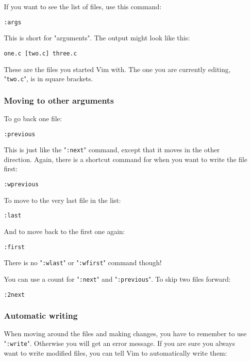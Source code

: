 If you want to see the list of files, use this command:

 \begin{Verbatim}[samepage=true]
 :args
 \end{Verbatim}

This is short for "arguments".
The output might look like this:

		\begin{Verbatim}[samepage=true]
    one.c [two.c] three.c 
						\end{Verbatim}

These are the files you started Vim with.
The one you are currently editing, "\verb!two.c!", is in square brackets.

\subsubsection{Moving to other arguments}
To go back one file:

 \begin{Verbatim}[samepage=true]
 :previous
 \end{Verbatim}

This is just like the "\verb!:next!" command, except that it moves in the other direction.
Again, there is a shortcut command for when you want to write the file first:

 \begin{Verbatim}[samepage=true]
 :wprevious
 \end{Verbatim}

To move to the very last file in the list:

 \begin{Verbatim}[samepage=true]
 :last
 \end{Verbatim}

And to move back to the first one again:

 \begin{Verbatim}[samepage=true]
 :first
 \end{Verbatim}

There is no "\verb!:wlast!" or "\verb!:wfirst!" command though!

You can use a count for "\verb!:next!" and "\verb!:previous!".
To skip two files forward:

 \begin{Verbatim}[samepage=true]
 :2next
 \end{Verbatim}

\subsubsection{Automatic writing}
When moving around the files and making changes, you have to remember to use "\verb!:write!".
Otherwise you will get an error message.
If you are sure you always want to write modified files, you can tell Vim to automatically write them:


